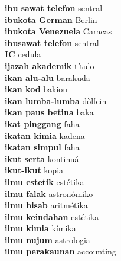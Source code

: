 \textbf{ ibu sawat telefon  } sentral \\
\textbf{ ibukota German  } Berlin \\
\textbf{ ibukota Venezuela  } Caracas \\
\textbf{ ibusawat telefon  } sentral \\
\textbf{ IC  } cedula \\
\textbf{ ijazah akademik  } título \\
\textbf{ ikan alu-alu  } barakuda \\
\textbf{ ikan kod  } bakiou \\
\textbf{ ikan lumba-lumba  } dòlfein \\
\textbf{ ikan paus betina  } baka \\
\textbf{ ikat pinggang  } faha \\
\textbf{ ikatan kimia  } kadena \\
\textbf{ ikatan simpul  } faha \\
\textbf{ ikut serta  } kontinuá \\
\textbf{ ikut-ikut  } kopia \\
\textbf{ ilmu estetik  } estétika \\
\textbf{ ilmu falak  } astronómiko \\
\textbf{ ilmu hisab  } aritmétika \\
\textbf{ ilmu keindahan  } estétika \\
\textbf{ ilmu kimia  } kímika \\
\textbf{ ilmu nujum  } astrologia \\
\textbf{ ilmu perakaunan  } accounting \\
